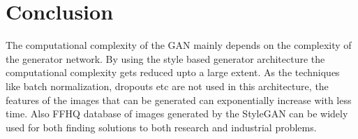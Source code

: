 \chapter{Conclusion}
\label{chapter:conclusion}
\begin{Conclusion}

The computational complexity of the GAN mainly depends on the complexity of the generator network. By using the style based generator architecture the computational complexity gets reduced upto a large extent. As the techniques like batch normalization, dropouts etc are not used in this architecture, the features of the images that can be generated can exponentially increase with less time. Also FFHQ database of images generated by the StyleGAN can be widely used for both finding solutions to both research and industrial problems. 
\end{Conclusion}
